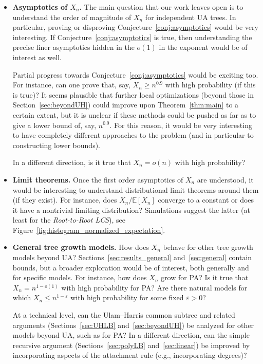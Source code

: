 \documentclass[11pt]{article}
\numberwithin{equation}{section}
\newcommand{\E}{\mathbb{E}} %
\newcommand{\eps}{\varepsilon} %
\theoremstyle{definition}
\begin{document}
\begin{itemize}
\item \textbf{Asymptotics of $X_{n}$.} The main question that our work leaves open is to understand the order of magnitude of $X_{n}$ for independent UA trees. In particular, proving or disproving Conjecture~\ref{conj:asymptotics} would be very interesting. If Conjecture~\ref{conj:asymptotics} is true, then understanding the 
precise 
finer asymptotics hidden in the $o(1)$ in the exponent would be of interest as well. 

Partial progress towards Conjecture~\ref{conj:asymptotics} would be exciting too. For instance, can one prove that, say, $X_{n} \geq n^{0.9}$ with high probability (if this is true)? 
It seems plausible that further local optimizations (beyond those in Section~\ref{sec:beyondUH}) could improve upon Theorem~\ref{thm:main} to a certain extent, but it is unclear if these methods could be pushed as far as to give a lower bound of, say, $n^{0.9}$. For this reason, it would be very interesting to have completely different approaches to the problem (and in particular to constructing lower bounds). 

In a different direction, is it true that $X_{n} = o(n)$ with high probability?

\item \textbf{Limit theorems.} Once the first order asymptotics of $X_{n}$ are understood, it would be interesting to understand distributional limit theorems around them (if they exist). 
For instance, does $X_{n} / \E[X_{n}]$ converge to a constant or does it have a nontrivial limiting distribution? 
Simulations suggest the latter (at least for the \emph{Root-to-Root LCS}), see Figure~\ref{fig:histogram_normalized_expectation}.



\item \textbf{General tree growth models.} 
How does $X_{n}$ behave for other tree growth models beyond UA? 
Sections~\ref{sec:results_general} and~\ref{sec:general} contain bounds, but a broader exploration would be of interest, both generally and for  specific models. 
For instance, how does $X_{n}$ grow for PA? Is it true that $X_{n} = n^{1-o(1)}$ with high probability for PA? 
Are there natural models for which $X_{n} \leq n^{1-\eps}$ with high probability for some fixed $\eps > 0$? 

At a technical level, can the Ulam--Harris common subtree and related arguments (Sections~\ref{sec:UHLB} and~\ref{sec:beyondUH}) be analyzed for other models beyond UA, such as for PA? 
In a different direction, can the simple recursive argument (Sections~\ref{sec:polyLB} and~\ref{sec:linear}) be improved by incorporating aspects of the attachment rule (e.g., incorporating degrees)? 



\end{itemize}
\end{document}
